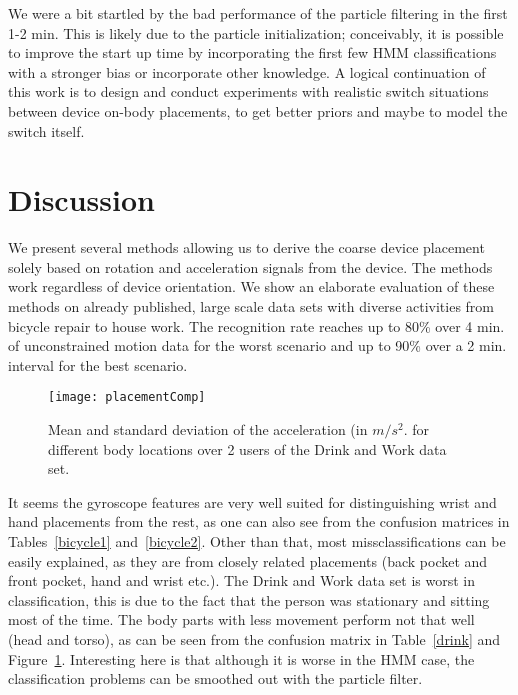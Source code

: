 


We were a bit startled by the bad performance of the particle
filtering in the first 1-2 min. This is likely due to the particle
initialization; conceivably, it is possible to improve the start up
time by incorporating the first few HMM classifications with a
stronger bias or incorporate other knowledge. 
A logical continuation of this work is to design and conduct experiments
with realistic switch situations between device on-body placements, 
to get better priors and maybe to model the switch itself.


\section{Discussion}

We present several methods allowing us to derive the coarse device
placement solely based on rotation and acceleration signals from the
device. The methods work regardless of device orientation.  We
show an elaborate evaluation of these methods on already
published, large scale data sets with diverse activities from
bicycle repair to house work.  The recognition rate reaches up to 80\%
over 4 min. of unconstrained motion data for the worst scenario and
up to 90\% over a 2 min. interval for the best scenario.
\begin{figure}[!t]
\centering
\texttt{[image: placementComp]}
\caption[Mean acceleration per location]{Mean and standard deviation of the acceleration (in $m/s^2$.
for different body locations over 2 users of the Drink and Work data set.}
\label{fig_loccomp}
\end{figure}
It seems the gyroscope features are very well
suited for distinguishing wrist and hand placements from the rest, as
one can also see from the confusion matrices in Tables~\ref{bicycle1}
and~\ref{bicycle2}.  Other than that, most missclassifications can be
easily explained, as they are from closely related placements (back
pocket and front pocket, hand and wrist etc.).  The Drink and Work
data set is worst in classification, this is due to the fact that the
person was stationary and sitting most of the time. The body parts
with less movement perform not that well (head and torso), as can
be seen from the confusion matrix in Table~\ref{drink}
and Figure~\ref{fig_loccomp}. Interesting here is that although it is worse in the HMM case, the
classification problems can be smoothed out with the particle filter.


